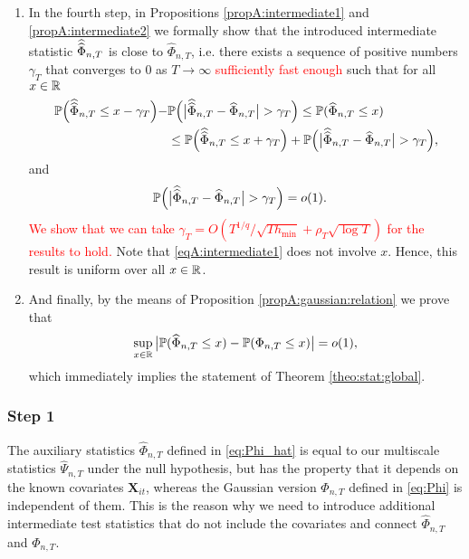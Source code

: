 \begin{enumerate}
\item In the fourth step, in Propositions \ref{propA:intermediate1} and \ref{propA:intermediate2} we formally show that the introduced intermediate statistic $\widehat{\widehat{\Phi}}_{n, T}$ is close to $\widehat{\Phi}_{n, T}$, i.e. there exists a sequence of positive numbers $\gamma_{T}$ that converges to $0$ as $T \to \infty$ \textcolor{red}{ sufficiently fast enough} such that for all $x\in \mathbb{R}$ 
\begin{align*}
\mathbb{P}\Big(\widehat{\widehat{\Phi}}_{n,T} \le x - \gamma_{T}\Big) - &\mathbb{P} \Big(\big|\widehat{\widehat{\Phi}}_{n,T} - \widehat{\Phi}_{n,T}\big| > \gamma_{T} \Big)\le \mathbb{P}(\widehat{\Phi}_{n, T} \le x) \\
&\le\mathbb{P}\Big(\widehat{\widehat{\Phi}}_{n,T} \le x + \gamma_{T}\Big) + \mathbb{P} \Big(\big|\widehat{\widehat{\Phi}}_{n,T} - \widehat{\Phi}_{n,T}\big| > \gamma_{T} \Big),
\end{align*}
and
\begin{align}\label{eqA:intermediate1}
\mathbb{P} \Big(\big|\widehat{\widehat{\Phi}}_{n,T} &- \widehat{\Phi}_{n,T}\big| > \gamma_{T} \Big) = o(1).
\end{align}
\textcolor{red}{We show that we can take $\gamma_T = O(T^{1/q} / \sqrt{T h_{\min}} + \rho_T \sqrt{\log T})$ for the results to hold.} Note that \eqref{eqA:intermediate1} does not involve $x$. Hence, this result is uniform over all $x \in \mathbb{R}$. 

\item And finally, by the means of Proposition \ref{propA:gaussian:relation} we prove that  
\begin{equation*}
\sup_{x \in \mathbb{R}} \big| \mathbb{P}(\widehat{\Phi}_{n, T} \le x) - \mathbb{P}(\Phi_{n,T} \le x) \big| = o(1),
\end{equation*}
which immediately implies the statement of Theorem \ref{theo:stat:global}.
\end{enumerate}

\subsubsection*{Step 1}

The auxiliary statistics $\widehat{\Phi}_{n,T}$ defined in \eqref{eq:Phi_hat} is equal to our multiscale statistics $\widehat{\Psi}_{n,T}$ under the null hypothesis, but has the property that it depends on the known covariates $\mathbf{X}_{it}$, whereas the Gaussian version $\Phi_{n,T}$ defined in \eqref{eq:Phi} is independent of them. This is the reason why we need to introduce additional intermediate test statistics that do not include the covariates and connect $\widehat{\Phi}_{n,T}$ and $\Phi_{n,T}$. 

